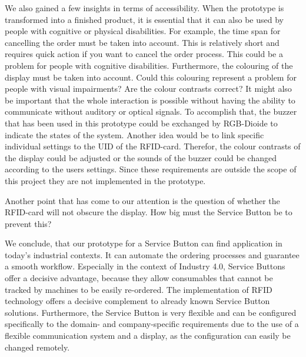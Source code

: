 We also gained a few insights in terms of accessibility. When the prototype is transformed into a finished product, it is essential that it can also be used by people with cognitive or physical disabilities.
For example, the time span for cancelling the order must be taken into account. This is relatively short and requires quick action if you want to cancel the order process. This could be a problem for people with cognitive disabilities. Furthermore, the colouring of the display must be taken into account. Could this colouring represent a problem for people with visual impairments? Are the colour contrasts correct? It might also be important that the whole interaction is possible without having the ability to communicate without auditory or optical signals. To accomplish that, the buzzer that has been used in this prototype could be exchanged by RGB-Dioide to indicate the states of the system. Another idea would be to link specific individual settings to the UID of the RFID-card. Therefor, the colour contrasts of the display could be adjusted or the sounds of the buzzer could be changed according to the users settings. Since these requirements are outside the scope of this project they are not implemented in the prototype.

Another point that has come to our attention is the question of whether the RFID-card will not obscure the display. How big must the Service Button be to prevent this?

We conclude, that our prototype for a Service Button can find application in today's industrial contexts. It can automate the ordering processes and guarantee a smooth workflow. Especially in the context of Industry 4.0, Service Buttons offer a decisive advantage, because they allow consumables that cannot be tracked by machines to be easily re-ordered. 
The implementation of RFID technology offers a decisive complement to already known Service Button solutions. Furthermore, the Service Button is very flexible and can be configured specifically to the domain- and company-specific requirements due to the use of a flexible communication system and a display, as the configuration can easily be changed remotely.

